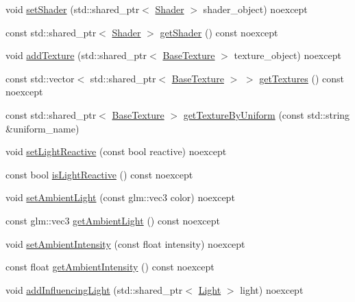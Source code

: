 \begin{DoxyCompactItemize}
\item 
void \hyperlink{class_graphics_1_1_renderable_a481dfc871e6129e8ee55482207ddc7fa}{set\+Shader} (std\+::shared\+\_\+ptr$<$ \hyperlink{class_graphics_1_1_shader}{Shader} $>$ shader\+\_\+object) noexcept
\item 
const std\+::shared\+\_\+ptr$<$ \hyperlink{class_graphics_1_1_shader}{Shader} $>$ \hyperlink{class_graphics_1_1_renderable_a542b918d1c6375ffdd06881d3fc31edd}{get\+Shader} () const noexcept
\item 
void \hyperlink{class_graphics_1_1_renderable_a8014f2c976291a09d452330448ca72d6}{add\+Texture} (std\+::shared\+\_\+ptr$<$ \hyperlink{class_graphics_1_1_base_texture}{Base\+Texture} $>$ texture\+\_\+object) noexcept
\item 
const std\+::vector$<$ std\+::shared\+\_\+ptr$<$ \hyperlink{class_graphics_1_1_base_texture}{Base\+Texture} $>$ $>$ \hyperlink{class_graphics_1_1_renderable_ac1634b94ac82b2b470010a3221c15643}{get\+Textures} () const noexcept
\item 
const std\+::shared\+\_\+ptr$<$ \hyperlink{class_graphics_1_1_base_texture}{Base\+Texture} $>$ \hyperlink{class_graphics_1_1_renderable_a9d134bc92527be7b68c65c8e5d70d8c0}{get\+Texture\+By\+Uniform} (const std\+::string \&uniform\+\_\+name)
\item 
void \hyperlink{class_graphics_1_1_renderable_a0166ebd26cac50f87ec7a33c5db9a3c5}{set\+Light\+Reactive} (const bool reactive) noexcept
\item 
const bool \hyperlink{class_graphics_1_1_renderable_a066fd1f919bdc7f2e562419f3e512dcd}{is\+Light\+Reactive} () const noexcept
\item 
void \hyperlink{class_graphics_1_1_renderable_ae50c65b85cb389df96b8e913b6dfe580}{set\+Ambient\+Light} (const glm\+::vec3 color) noexcept
\item 
const glm\+::vec3 \hyperlink{class_graphics_1_1_renderable_a9c000568c9df44433eceb76c5f1e39c0}{get\+Ambient\+Light} () const noexcept
\item 
void \hyperlink{class_graphics_1_1_renderable_acd1b9f38205aa1a637c46fe7faeed60c}{set\+Ambient\+Intensity} (const float intensity) noexcept
\item 
const float \hyperlink{class_graphics_1_1_renderable_a678da7336bb38a8cab7edf423f6dfed5}{get\+Ambient\+Intensity} () const noexcept
\item 
void \hyperlink{class_graphics_1_1_renderable_aa33e801d00279049d15e1a133f76eaf4}{add\+Influencing\+Light} (std\+::shared\+\_\+ptr$<$ \hyperlink{class_graphics_1_1_light}{Light} $>$ light) noexcept

\end{DoxyCompactItemize}
